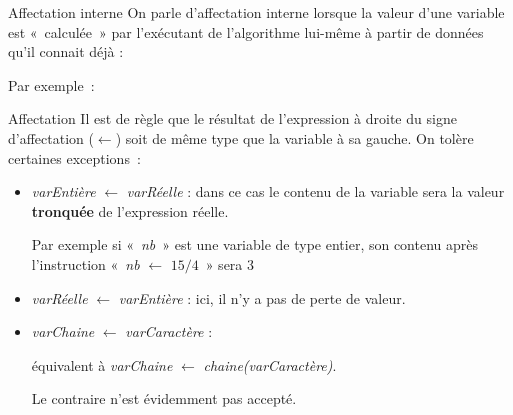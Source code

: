 \begin{frame}{Affectation interne }
	On parle d’affectation interne lorsque la valeur d’une variable est
	«~calculée~» par l’exécutant de l’algorithme lui-même à partir de
	données qu’il connait déjà :

	\bigskip
	
	
	\bigskip
	
	Par exemple~:

\end{frame}

\begin{frame}{Affectation}
	Il est de règle que le résultat de l’expression à droite du signe
	d’affectation ($\gets$) soit de
	même type que la variable à sa gauche. On tolère certaines exceptions~:
	\begin{itemize}
	\item
		\textit{varEntière}{ $\gets$ }\textit{varRéelle} : 
		dans ce cas le contenu de la variable sera la valeur \textbf{tronquée}
		de l’expression réelle. 
		
		Par exemple si «~\textit{nb}~» est
		une variable de type entier, son contenu après l’instruction
		«~\textit{nb}{ $\gets$ }\textit{$15/4$}~» 
		sera 3
	\item 
		\textit{varRéelle}{ $\gets$ }\textit{varEntière} :
		ici, il n'y a pas de perte de valeur.
	\item 
		\textit{varChaine}{ $\gets$ }\textit{varCaractère} : 
		
		équivalent à \textit{varChaine}{ $\gets$ }\textit{chaine(varCaractère)}.
		
		Le contraire n'est évidemment pas accepté.
	\end{itemize}
\end{frame}

